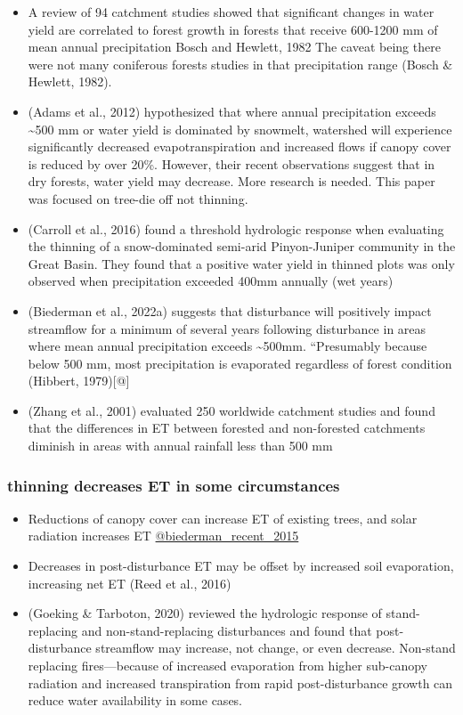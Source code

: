 \documentclass[
]{agujournal2019}
\begin{document}
\begin{itemize}
\item
  A review of 94 catchment studies showed that significant changes in
  water yield are correlated to forest growth in forests that receive
  600-1200 mm of mean annual precipitation Bosch and Hewlett, 1982 The
  caveat being there were not many coniferous forests studies in that
  precipitation range (Bosch \& Hewlett, 1982).
\item
  (Adams et al., 2012) hypothesized that where annual precipitation
  exceeds \textasciitilde500 mm or water yield is dominated by snowmelt,
  watershed will experience significantly decreased evapotranspiration
  and increased flows if canopy cover is reduced by over 20\%. However,
  their recent observations suggest that in dry forests, water yield may
  decrease. More research is needed. This paper was focused on tree-die
  off not thinning.
\item
  (Carroll et al., 2016) found a threshold hydrologic response when
  evaluating the thinning of a snow-dominated semi-arid Pinyon-Juniper
  community in the Great Basin. They found that a positive water yield
  in thinned plots was only observed when precipitation exceeded 400mm
  annually (wet years)
\item
  (Biederman et al., 2022a) suggests that disturbance will positively
  impact streamflow for a minimum of several years following disturbance
  in areas where mean annual precipitation exceeds \textasciitilde500mm.
  ``Presumably because below 500 mm, most precipitation is evaporated
  regardless of forest condition (Hibbert, 1979){[}@{]}
\item
  (Zhang et al., 2001) evaluated 250 worldwide catchment studies and
  found that the differences in ET between forested and non-forested
  catchments diminish in areas with annual rainfall less than 500 mm
\end{itemize}

\subsubsection{thinning decreases ET in some
circumstances}\label{thinning-decreases-et-in-some-circumstances}

\begin{itemize}
\item
  Reductions of canopy cover can increase ET of existing trees, and
  solar radiation increases ET
  \href{Chen\%20et\%20al.,\%202005;\%20Bennett\%20et\%20al.,\%202018}{@biederman\_recent\_2015}
\item
  Decreases in post-disturbance ET may be offset by increased soil
  evaporation, increasing net ET (Reed et al., 2016)
\item
  (Goeking \& Tarboton, 2020) reviewed the hydrologic response of
  stand-replacing and non-stand-replacing disturbances and found that
  post-disturbance streamflow may increase, not change, or even
  decrease. Non-stand replacing fires---because of increased evaporation
  from higher sub-canopy radiation and increased transpiration from
  rapid post-disturbance growth can reduce water availability in some
  cases.
\end{itemize}
\end{document}
